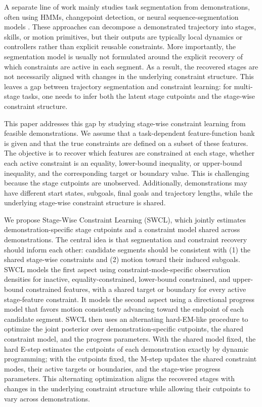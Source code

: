 \documentclass[lettersize,journal]{IEEEtran}
\begin{document}
A separate line of work mainly studies task segmentation from demonstrations, often using HMMs, changepoint detection, or neural sequence-segmentation models \cite{rabiner1989hmm,johnson2013hsmm,truong2020selective,aminikhanghahi2017survey,niekum2015grounded,medina2017stable,tanwani2016semi,shiarlis2018taco,kipf2019compile}. These approaches can decompose a demonstrated trajectory into stages, skills, or motion primitives, but their outputs are typically local dynamics or controllers rather than explicit reusable constraints. More importantly, the segmentation model is usually not formulated around the explicit recovery of which constraints are active in each segment. As a result, the recovered stages are not necessarily aligned with changes in the underlying constraint structure. This leaves a gap between trajectory segmentation and constraint learning: for multi-stage tasks, one needs to infer both the latent stage cutpoints and the stage-wise constraint structure.

This paper addresses this gap by studying stage-wise constraint learning from feasible demonstrations. We assume that a task-dependent feature-function bank is given and that the true constraints are defined on a subset of these features. The objective is to recover which features are constrained at each stage, whether each active constraint is an equality, lower-bound inequality, or upper-bound inequality, and the corresponding target or boundary value. This is challenging because the stage cutpoints are unobserved. Additionally, demonstrations may have different start states, subgoals, final goals and trajectory lengths, while the underlying stage-wise constraint structure is shared.

We propose Stage-Wise Constraint Learning (SWCL), which jointly estimates demonstration-specific stage cutpoints and a constraint model shared across demonstrations. The central idea is that segmentation and constraint recovery should inform each other: candidate segments should be consistent with (1) the shared stage-wise constraints and (2) motion toward their induced subgoals. SWCL models the first aspect using constraint-mode-specific observation densities for inactive, equality-constrained, lower-bound constrained, and upper-bound constrained features, with a shared target or boundary for every active stage-feature constraint. It models the second aspect using a directional progress model that favors motion consistently advancing toward the endpoint of each candidate segment. SWCL then uses an alternating hard-EM-like procedure to optimize the joint posterior over demonstration-specific cutpoints, the shared constraint model, and the progress parameters. With the shared model fixed, the hard E-step estimates the cutpoints of each demonstration exactly by dynamic programming; with the cutpoints fixed, the M-step updates the shared constraint modes, their active targets or boundaries, and the stage-wise progress parameters. This alternating optimization aligns the recovered stages with changes in the underlying constraint structure while allowing their cutpoints to vary across demonstrations.
\end{document}
